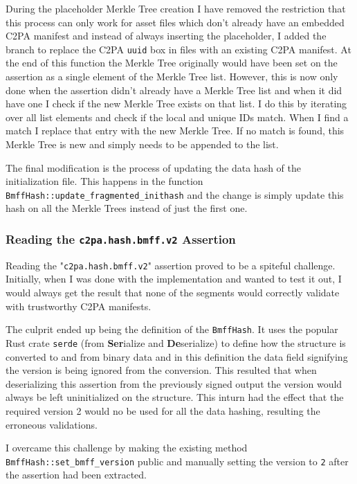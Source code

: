 During the placeholder Merkle Tree creation I have removed the restriction that this process can only work for asset files which don't already have an embedded C2PA manifest and instead of always inserting the placeholder, I added the branch to replace the C2PA \texttt{uuid} box in files with an existing C2PA manifest. At the end of this function the Merkle Tree originally would have been set on the assertion as a single element of the Merkle Tree list. However, this is now only done when the assertion didn't already have a Merkle Tree list and when it did have one I check if the new Merkle Tree exists on that list. I do this by iterating over all list elements and check if the local and unique IDs match. When I find a match I replace that entry with the new Merkle Tree. If no match is found, this Merkle Tree is new and simply needs to be appended to the list.

The final modification is the process of updating the data hash of the initialization file. This happens in the function \texttt{BmffHash::update\_fragmented\_inithash} and the change is simply update this hash on all the Merkle Trees instead of just the first one.

\subsubsection{Reading the \texttt{c2pa.hash.bmff.v2} Assertion}

Reading the "\texttt{c2pa.hash.bmff.v2}" assertion proved to be a spiteful challenge. Initially, when I was done with the implementation and wanted to test it out, I would always get the result that none of the segments would correctly validate with trustworthy C2PA manifests.

The culprit ended up being the definition of the \texttt{BmffHash}. It uses the popular Rust crate \texttt{serde} (from \textbf{Ser}ialize and \textbf{De}serialize) to define how the structure is converted to and from binary data and in this definition the data field signifying the version is being ignored from the conversion. This resulted that when deserializing this assertion from the previously signed output the version would always be left uninitialized on the structure. This inturn had the effect that the required version 2 would no be used for all the data hashing, resulting the erroneous validations.

I overcame this challenge by making the existing method \texttt{BmffHash::set\_bmff\_version} public and manually setting the version to \texttt{2} after the assertion had been extracted.

